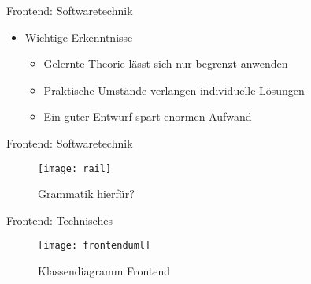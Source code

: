 \pagebreak
\begin{frame}{Frontend: Softwaretechnik}

	\begin{itemize}
		\item Wichtige Erkenntnisse
		\pause
		\begin{itemize}
			\item Gelernte Theorie l\"asst sich nur begrenzt anwenden
			\pause
			\item Praktische Umst\"ande verlangen individuelle L\"osungen
			\pause
			\item Ein guter Entwurf spart enormen Aufwand
		\end{itemize}
	\end{itemize}
	
\pagebreak

\end{frame}

\begin{frame}{Frontend: Softwaretechnik}

\begin{figure}
  \begin{center}
    \leavevmode
      \texttt{[image: rail]}
    \caption{Grammatik hierf\"ur?}
  \end{center}
\end{figure}

	
\end{frame}

\begin{frame}{Frontend: Technisches}

\begin{figure}
  \begin{center}
    \leavevmode
      \texttt{[image: frontenduml]}
    \caption{Klassendiagramm Frontend}
  \end{center}
\end{figure}

\end{frame}

